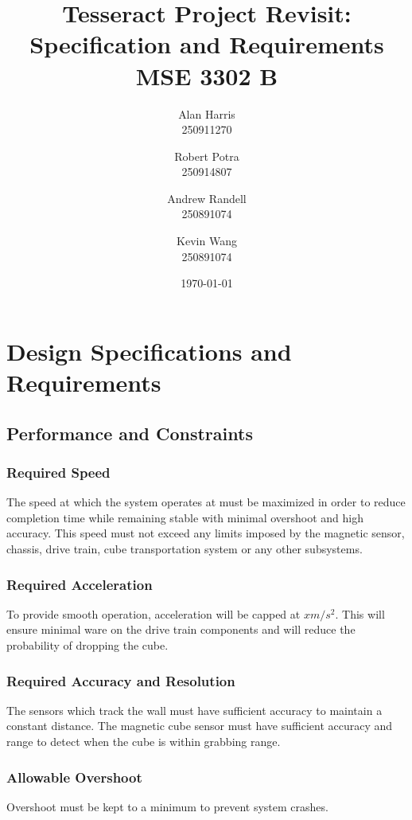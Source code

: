 \documentclass[12pt]{article}
\begin{document}
\title{\textbf{Tesseract Project Revisit:\\Specification and Requirements\\ MSE 3302 B}}
\author{
  Alan Harris\\
  250911270
  \and
  Robert Potra\\
  250914807
  \and
  Andrew Randell\\
  250891074
  \and
  Kevin Wang\\
  250891074
}
\date{\today}
\maketitle

\tableofcontents
\thispagestyle{empty}

\pagebreak
\setcounter{page}{1}
 
\section{Design Specifications and Requirements}
\subsection{Performance and Constraints}
\subsubsection{Required Speed}
The speed at which the system operates at must be maximized in order to reduce completion time while remaining stable with minimal overshoot and high accuracy. This speed must not exceed any limits imposed by the magnetic sensor, chassis, drive train, cube transportation system or any other subsystems.
\subsubsection{Required Acceleration}
To provide smooth operation, acceleration will be capped at $x m/s^2$. This will ensure minimal ware on the drive train components and will reduce the probability of dropping the cube.
\subsubsection{Required Accuracy and Resolution}
The sensors which track the wall must have sufficient accuracy to maintain a constant distance. The magnetic cube sensor must have sufficient accuracy and range to detect when the cube is within grabbing range.
\subsubsection{Allowable Overshoot}
Overshoot must be kept to a minimum to prevent system crashes.
\end{document}
